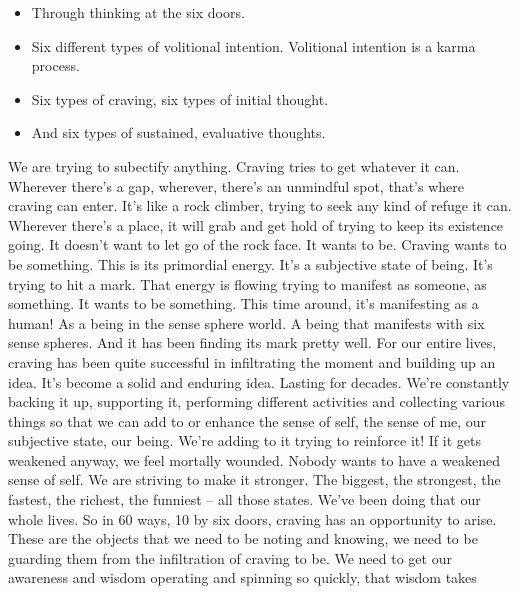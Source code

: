 \documentclass[letterpaper,10pt,english]{sphinxmanual}
\begin{document}
\begin{itemize}
\item {} 
\sphinxAtStartPar
{} Through thinking at the six doors.

\item {} 
\sphinxAtStartPar
Six different types of volitional intention. Volitional intention is a karma process.

\item {} 
\sphinxAtStartPar
Six types of craving, six types of initial thought.

\item {} 
\sphinxAtStartPar
And six types of sustained, evaluative thoughts.

\end{itemize}

\sphinxAtStartPar
We  are  trying  to  subectify  anything.  Craving  tries  to  get  whatever  it
can.  Wherever  there’s  a  gap,  wherever,  there’s  an  unmindful  spot,  that’s
where craving can enter. It’s like a rock climber, trying to seek any kind of
refuge it can. Wherever there’s a place, it will grab and get hold of trying to
keep its existence going. It doesn’t want to let go of the rock face. It wants to
be. Craving wants to be something. This is its primordial energy. It’s a subjective state of being. It’s trying to hit a mark. That energy is flowing trying
to manifest as someone, as something. It wants to be something. This time
around, it’s manifesting as a human! As a being in the sense sphere world. A
being that manifests with six sense spheres. And it has been finding its mark
pretty well. For our entire lives, craving has been quite successful in infiltrating the moment and building up an idea. It’s become a solid and enduring idea. Lasting for decades. We’re constantly backing it up, supporting it,
performing different activities and collecting various things so that we can
add to or enhance the sense of self, the sense of me, our subjective state, our
being. We’re adding to it trying to reinforce it! If it gets weakened anyway,
we feel mortally wounded. Nobody wants to have a weakened sense of self.
We are striving to make it stronger. The biggest, the strongest, the fastest, the
richest, the funniest – all those states. We’ve been doing that our whole lives.
So  in  60  ways,  10  by  six  doors,  craving  has  an  opportunity  to  arise.
These  are  the  objects  that  we  need  to  be  noting  and  knowing,  we  need  to
be guarding them from the infiltration of craving to be. We need to get our
awareness and wisdom operating and spinning so quickly, that wisdom takes
\end{document}
